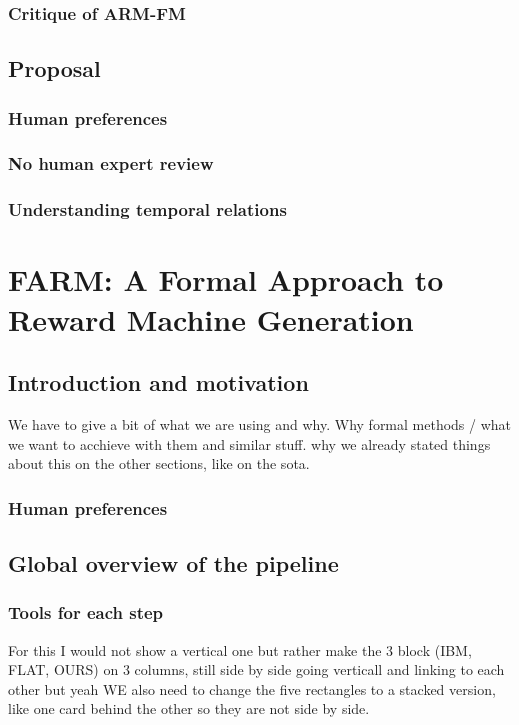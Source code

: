\documentclass[11pt,english,listoffigures,listoftables, listofalgorithms]{tfgetsinf}
\begin{document}
\subsection{Critique of ARM-FM}
\section{Proposal}
\subsection{Human preferences}
\subsection{No human expert review}
\subsection{Understanding temporal relations}


\chapter{FARM: A Formal Approach to Reward Machine Generation}
\label{chap:farm}
\section{Introduction and motivation}

We have to give a bit of what we are using and why. Why formal methods / what we want to acchieve with them and similar stuff. why we already stated things about this on the other sections, like on the sota.

\subsection{Human preferences}
\section{Global overview of the pipeline}

\subsection{Tools for each step}
For this I would not show a vertical one but rather make the 3 block (IBM, FLAT, OURS) on 3 columns, still side by side going verticall and linking to each other but yeah
WE also need to change the five rectangles to a stacked version, like one card behind the other so they are not side by side.
\end{document}
